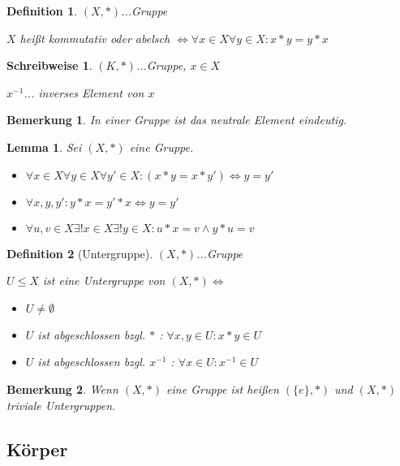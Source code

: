 \documentclass[twocolumn]{article}
\newtheorem{lemma}[theorem]{Lemma}
\newtheorem{definition}{Definition}[section]
\newtheorem*{remark}{Bemerkung}
\newtheorem*{schreibweise}{Schreibweise}
\newcommand*{\logeq}{\Leftrightarrow}
\begin{document}
\begin{definition}
	$(X,*)$...Gruppe
	
	$X$ heißt kommutativ oder abelsch $\logeq \forall x \in X \forall y \in X : x*y=y*x$
\end{definition}

\begin{schreibweise}
	$(K,*)$...Gruppe, $x \in X$
	
	$x^{-1}$... inverses Element von $x$
\end{schreibweise}

\begin{remark}
	In einer Gruppe ist das neutrale Element eindeutig.
\end{remark}

\begin{lemma}
	Sei $(X,*)$ eine Gruppe.
	
	\begin{itemize}
		\item $\forall x \in X \forall y \in X \forall y' \in X : (x*y=x*y') \logeq y=y'$
		\item $\forall x,y,y' : y*x=y'*x \logeq y=y'$
		\item $\forall u,v \in X \exists ! x \in X \exists ! y \in X : u * x = v \land y * u = v$
	\end{itemize}
\end{lemma}

\begin{definition}[Untergruppe]
	$(X,*)$...Gruppe
	
	$U \leq X$ ist eine Untergruppe von $(X,*) \logeq$
	
	\begin{itemize}
		\item $U \neq \emptyset$
		\item $U$ ist abgeschlossen bzgl. $*$ : $\forall x,y \in U : x*y \in U$
		\item $U$ ist abgeschlossen bzgl. $x^{-1}$ : $\forall x \in U : x^{-1} \in U$
	\end{itemize}
\end{definition}

\begin{remark}
	Wenn $(X,*)$ eine Gruppe ist heißen $(\{e\},*)$ und $(X,*)$ triviale Untergruppen.
\end{remark}

\subsection{Körper}
\end{document}
